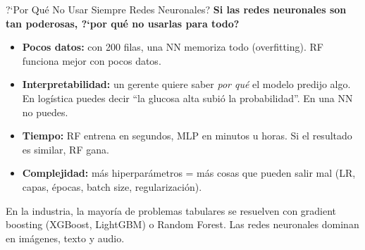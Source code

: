 \documentclass[aspectratio=169, 11pt]{beamer}
\begin{document}
\begin{frame}{?`Por Qu\'e No Usar Siempre Redes Neuronales?}
  \vspace{-4pt}
  {\footnotesize\color{arcaDark}\bfseries
    Si las redes neuronales son tan poderosas, ?`por qu\'e no usarlas
    para todo?}

  \vspace{6pt}
  {\footnotesize
  \begin{itemize}\setlength{\itemsep}{5pt}
    \item[{\color{arcaRed}\scriptsize\faTimesCircle}]
      \textbf{Pocos datos:} con 200 filas, una NN memoriza todo
      (overfitting). RF funciona mejor con pocos datos.
    \item[{\color{arcaRed}\scriptsize\faTimesCircle}]
      \textbf{Interpretabilidad:} un gerente quiere saber \textit{por qu\'e}
      el modelo predijo algo. En log\'istica puedes decir ``la glucosa
      alta subi\'o la probabilidad''. En una NN no puedes.
    \item[{\color{arcaRed}\scriptsize\faTimesCircle}]
      \textbf{Tiempo:} RF entrena en segundos, MLP en minutos u horas.
      Si el resultado es similar, RF gana.
    \item[{\color{arcaRed}\scriptsize\faTimesCircle}]
      \textbf{Complejidad:} m\'as hiperpar\'ametros = m\'as cosas que
      pueden salir mal (LR, capas, \'epocas, batch size, regularizaci\'on).
  \end{itemize}
  }

  \vspace{4pt}
  {\scriptsize\color{textMuted}
    \faLightbulb\hspace{4pt} En la industria, la mayor\'ia de problemas
    tabulares se resuelven con gradient boosting (XGBoost, LightGBM)
    o Random Forest. Las redes neuronales dominan en im\'agenes,
    texto y audio.}
\end{frame}
\end{document}
